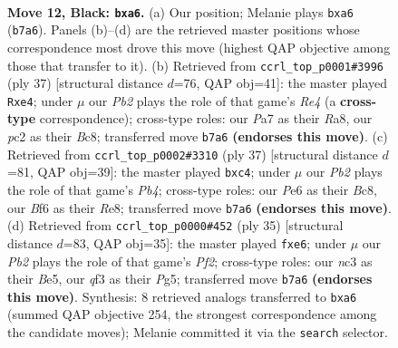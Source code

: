 \documentclass[11pt]{article}
\begin{document}
\begin{figure}[p]
\label{fig:thought-m21}
\end{figure}

\clearpage

\begin{figure}[p]\centering
\begin{subfigure}{0.46\textwidth}\centering
\resizebox{\linewidth}{!}{%
\newchessgame
\chessboard[
  setfen={r2qk2r/pp3p1p/B3pbp1/3p4/P2P2P1/2N2Q1P/1PP2P2/R3K2R b KQkq - 0 12},
  showmover=false,
  pgfstyle=straightmove, color=movearrow, markmove={b7-a6}
]}
\caption{}
\end{subfigure}\hfill
\begin{subfigure}{0.46\textwidth}\centering
\resizebox{\linewidth}{!}{%
\newchessgame
\chessboard[
  setfen={r1bq2k1/1p3p2/2p3pp/p1Ppr3/N3B2P/6P1/PP2PP2/2RQR1K1 b - - 0 19},
  showmover=false,
  pgfstyle=straightmove, color=movearrow, markmove={e5-e4}
]}
\caption{}
\end{subfigure}
\\[4pt]
\begin{subfigure}{0.46\textwidth}\centering
\resizebox{\linewidth}{!}{%
\newchessgame
\chessboard[
  setfen={r1bqr1k1/2p2pp1/p6p/1p2P3/2N2Q2/2P4P/P4PP1/R1B1R1K1 b - - 0 19},
  showmover=false,
  pgfstyle=straightmove, color=movearrow, markmove={b5-c4}
]}
\caption{}
\end{subfigure}\hfill
\begin{subfigure}{0.46\textwidth}\centering
\resizebox{\linewidth}{!}{%
\newchessgame
\chessboard[
  setfen={r2q1rk1/pp3p2/3pB2p/2p1b1p1/P3P2P/5P2/1PP2P2/R1BQRK2 b - - 0 18},
  showmover=false,
  pgfstyle=straightmove, color=movearrow, markmove={f7-e6}
]}
\caption{}
\end{subfigure}
\caption{\textbf{Move 12, Black: \texttt{bxa6}.} (a) Our position; Melanie plays \texttt{bxa6} (\texttt{b7a6}). Panels (b)--(d) are the retrieved master positions whose correspondence most drove this move (highest QAP objective among those that transfer to it). (b) Retrieved from \texttt{ccrl\_top\_p0001\#3996} (ply 37) [structural distance $d$=76, QAP obj=41]: the master played \texttt{Rxe4}; under $\mu$ our \emph{Pb2} plays the role of that game's \emph{Re4} (a \textbf{cross-type} correspondence); cross-type roles: our \emph{P}a7 as their \emph{R}a8, our \emph{p}c2 as their \emph{B}c8; transferred move \texttt{b7a6} \textbf{(endorses this move)}. (c) Retrieved from \texttt{ccrl\_top\_p0002\#3310} (ply 37) [structural distance $d$=81, QAP obj=39]: the master played \texttt{bxc4}; under $\mu$ our \emph{Pb2} plays the role of that game's \emph{Pb4}; cross-type roles: our \emph{P}e6 as their \emph{B}c8, our \emph{B}f6 as their \emph{R}e8; transferred move \texttt{b7a6} \textbf{(endorses this move)}. (d) Retrieved from \texttt{ccrl\_top\_p0000\#452} (ply 35) [structural distance $d$=83, QAP obj=35]: the master played \texttt{fxe6}; under $\mu$ our \emph{Pb2} plays the role of that game's \emph{Pf2}; cross-type roles: our \emph{n}c3 as their \emph{B}e5, our \emph{q}f3 as their \emph{P}g5; transferred move \texttt{b7a6} \textbf{(endorses this move)}. Synthesis: 8 retrieved analogs transferred to \texttt{bxa6} (summed QAP objective 254, the strongest correspondence among the candidate moves); Melanie committed it via the \texttt{search} selector.}

\end{figure}
\end{document}
